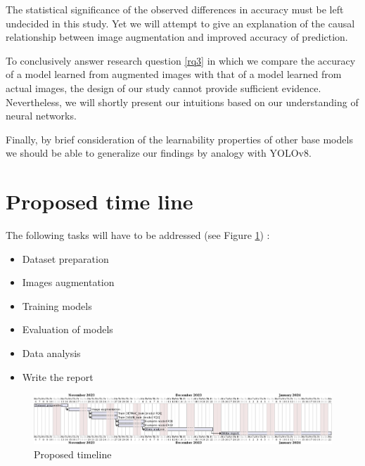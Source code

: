 \documentclass[]{article}
\begin{document}
	The statistical significance of the observed differences in accuracy must be left undecided in this study. Yet we will attempt to give an explanation of the causal relationship between image augmentation and improved accuracy of prediction.
	
	To conclusively answer research question \ref{rq3} in which we compare the accuracy of a model learned from augmented images with that of a model learned from actual images, the design of our study cannot provide sufficient evidence. Nevertheless, we will shortly present our intuitions based on our understanding of neural networks.
	
	Finally, by brief consideration of the learnability properties of other base models we should be able to generalize our findings by analogy with YOLO{\small v8}.	

\section{Proposed time line}

The following tasks will have to be addressed (see Figure \ref{fig:timeline}) :
\begin{itemize}
	\item Dataset preparation
	\item Images augmentation
	\item Training models
	\item Evaluation of models
	\item Data analysis
	\item Write the report
\end{itemize}

\begin{figure}[H]
	\centering
	\includegraphics[width=\textwidth]{proposal-timing}
	\caption{Proposed timeline}
	\label{fig:timeline}
\end{figure}

\printbibliography
\end{document}
